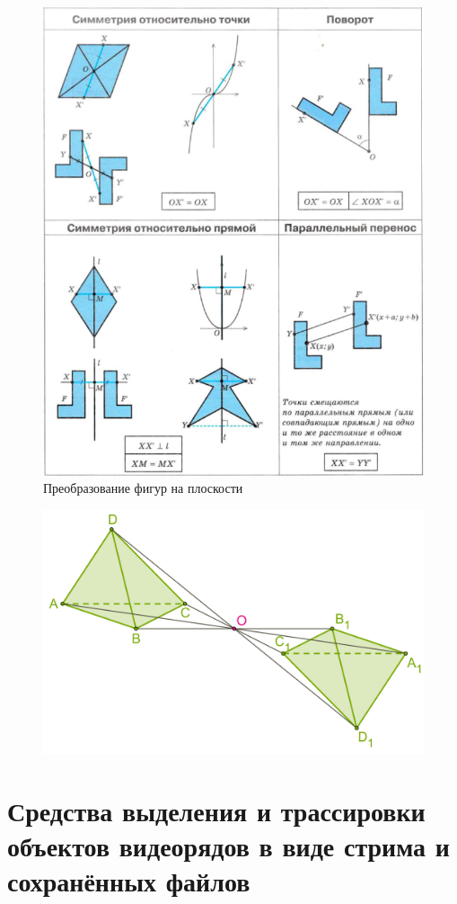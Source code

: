 \documentclass[]{article}
\begin{document}
\begin{figure}
	\centering
	\includegraphics[width=0.7\linewidth]{screenshot001}
	\caption{Преобразование фигур на плоскости}
	\label{screenshot001}
\end{figure}

\begin{figure}
	\centering
	\includegraphics[scale=0.65]{Centr_sim.png}
	\caption{}
	\label{fig:Centr_sim}
\end{figure}

\newpage
\section{Средства выделения и трассировки объектов видеорядов в виде стрима и сохранённых файлов}
\end{document}
